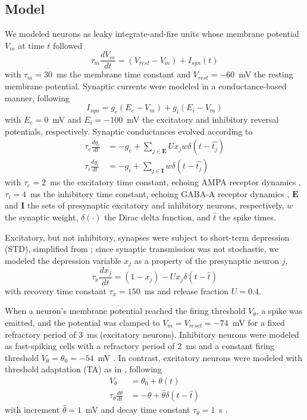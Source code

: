 \documentclass[pdflatex,referee,iicol,sn-basic]{sn-jnl}
\begin{document}
\subsection{Model}\label{sec-model}

We modeled neurons as leaky integrate-and-fire units whose membrane potential $V_m$ at time $t$ followed
\begin{equation}
    \tau_m \frac{dV_m}{dt} = (V_{rest}-V_m) + I_{syn}(t)
\end{equation}
with $\tau_m = 30$~ms the membrane time constant and $V_{rest} = -60$~mV the resting membrane potential. Synaptic currents were modeled in a conductance-based manner, following
\begin{equation}
    I_{syn} = g_e(E_e-V_m) + g_i(E_i-V_m)
\end{equation}
with $E_e = 0$~mV and $E_i = -100$~mV the excitatory and inhibitory reversal potentials, respectively. Synaptic conductances evolved according to
\begin{align} 
    \tau_e \frac{dg_e}{dt} &= -g_e + \sum_{j \in \boldsymbol E} U x_j w \delta(t - \hat{t_j}) \nonumber \\
    \tau_i \frac{dg_i}{dt} &= -g_i + \sum_{j \in \boldsymbol I} w \delta(t - \hat{t_j}) \label{eqn-gsyn}
\end{align}
with $\tau_e = 2$~ms the excitatory time constant, echoing AMPA receptor dynamics \citep{Hausser1997-cn}, $\tau_i = 4$~ms the inhibitory time constant, echoing GABA-A receptor dynamics \citep{Destexhe1994-oc}, $\boldsymbol E$ and $\boldsymbol I$ the sets of presynaptic excitatory and inhibitory neurons, respectively, $w$ the synaptic weight, $\delta(\cdot)$ the Dirac delta function, and $\hat{t}$ the spike times.

Excitatory, but not inhibitory, synapses were subject to short-term depression (STD), simplified from \cite{Tsodyks1997-qt}; since synaptic transmission was not stochastic, we modeled the depression variable $x_j$ as a property of the presynaptic neuron $j$,
\begin{equation}
    \tau_x \frac{dx_j}{dt} = (1-x_j) - U x_j \delta(t - \hat{t}) \label{eqn-xsyn}
\end{equation}
with recovery time constant $\tau_x = 150$~ms and release fraction $U = 0.4$.

When a neuron's membrane potential reached the firing threshold $V_\theta$, a spike was emitted, and the potential was clamped to $V_m = V_{reset} = -74$~mV for a fixed refractory period of 3~ms (excitatory neurons). Inhibitory neurons were modeled as fast-spiking cells with a refractory period of 2~ms and a constant firing threshold $V_\theta = \theta_0 = -54$~mV \citep{Mensi2012-au}. In contrast, excitatory neurons were modeled with threshold adaptation (TA) as in \cite{Teeter2018-iz}, following
\begin{align}
    V_\theta &= \theta_0 + \theta(t) \nonumber \\
    \tau_{\theta} \frac{d\theta}{dt} &= -\theta + \hat{\theta} \delta(t - \hat{t}) \label{eqn-TA}
\end{align}
with increment $\hat{\theta} = 1$~mV and decay time constant $\tau_{\theta} = 1$~s \citep{Henze2001-xd, Pozzorini2015-ei}.
\end{document}
